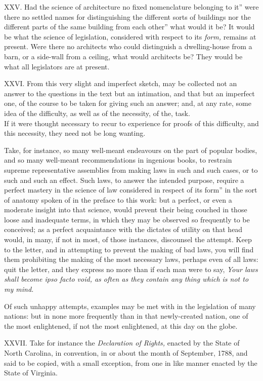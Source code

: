 \documentclass[12pt]{report}
\begin{document}
XXV. Had the science of architecture no fixed nomenclature belonging to
it'' were there no settled names for distinguishing the
different sorts of buildings nor the different parts of the same
building from each other'' what would it be? It would be what
the science of legislation, considered with respect to its \emph{form,}
remains at present. Were there no architects who could distinguish a
dwelling-house from a barn, or a side-wall from a ceiling, what would
architects be? They would be what all legislators are at present.

XXVI. From this very slight and imperfect sketch, may be collected not
an answer to the questions in the text but an intimation, and that but
an imperfect one, of the course to be taken for giving such an answer;
and, at any rate, some idea of the difficulty, as well as of the
necessity, of the, task.\\
If it were thought necessary to recur to experience for proofs of this
difficulty, and this necessity, they need not be long wanting.

Take, for instance, so many well-meant endeavours on the part of popular
bodies, and so many well-meant recommendations in ingenious books, to
restrain supreme representative assemblies from making laws in such and
such cases, or to such and such an effect. Such laws, to answer the
intended purpose, require a perfect mastery in the science of law
considered in respect of its form'' in the sort of anatomy
spoken of in the preface to this work: but a perfect, or even a moderate
insight into that science, would prevent their being couched in those
loose and inadequate terms, in which they may be observed so frequently
to be conceived; as a perfect acquaintance with the dictates of utility
on that head would, in many, if not in most, of those instances,
discounsel the attempt. Keep to the letter, and in attempting to prevent
the making of bad laws, you will find them prohibiting the making of the
most necessary laws, perhaps even of all laws: quit the letter, and they
express no more than if each man were to say, \emph{Your laws shall
become \emph{ipso facto} void, as often as they contain any thing which
is not to my mind.}

Of such unhappy attempts, examples may be met with in the legislation of
many nations: but in none more frequently than in that newly-created
nation, one of the most enlightened, if not the most enlightened, at
this day on the globe.

XXVII. Take for instance the \emph{Declaration of Rights,} enacted by
the State of North Carolina, in convention, in or about the month of
September, 1788, and said to be copied, with a small exception, from one
in like manner enacted by the State of Virginia.
\end{document}
